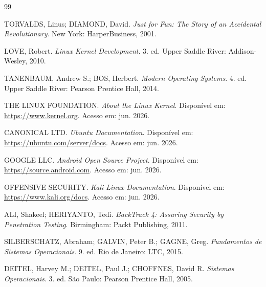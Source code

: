 \documentclass{article}
\begin{document}
\begin{thebibliography}{99}

TORVALDS, Linus; DIAMOND, David.
\textit{Just for Fun: The Story of an Accidental Revolutionary}.
New York: HarperBusiness, 2001.

LOVE, Robert.
\textit{Linux Kernel Development}.
3. ed. Upper Saddle River: Addison-Wesley, 2010.

TANENBAUM, Andrew S.; BOS, Herbert.
\textit{Modern Operating Systems}.
4. ed. Upper Saddle River: Pearson Prentice Hall, 2014.

THE LINUX FOUNDATION.
\textit{About the Linux Kernel}.
Disponível em: \url{https://www.kernel.org}.
Acesso em: jun. 2026.

CANONICAL LTD.
\textit{Ubuntu Documentation}.
Disponível em: \url{https://ubuntu.com/server/docs}.
Acesso em: jun. 2026.

GOOGLE LLC.
\textit{Android Open Source Project}.
Disponível em: \url{https://source.android.com}.
Acesso em: jun. 2026.

OFFENSIVE SECURITY.
\textit{Kali Linux Documentation}.
Disponível em: \url{https://www.kali.org/docs}.
Acesso em: jun. 2026.

ALI, Shakeel; HERIYANTO, Tedi.
\textit{BackTrack 4: Assuring Security by Penetration Testing}.
Birmingham: Packt Publishing, 2011.

SILBERSCHATZ, Abraham; GALVIN, Peter B.; GAGNE, Greg.
\textit{Fundamentos de Sistemas Operacionais}.
9. ed. Rio de Janeiro: LTC, 2015.

DEITEL, Harvey M.; DEITEL, Paul J.; CHOFFNES, David R.
\textit{Sistemas Operacionais}.
3. ed. São Paulo: Pearson Prentice Hall, 2005.

\end{thebibliography}
\end{document}
